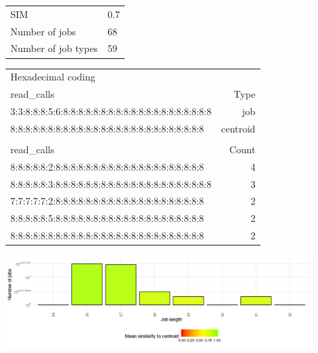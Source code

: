 \documentclass[]{llncs}
\begin{document}
\begingroup
  \centering
  \begin{tabular}{ll}
    SIM                 & 0.7 \\
    Number of jobs      & 68  \\
    Number of job types & 59  \\
  \end{tabular}
  \label{tab:use_case:pm_quant:stats}
\endgroup

\begingroup
  \centering
  \begin{tiny}
    \begin{tabular}{@{ }l@{ }|@{ }r@{ }}
      \rowcolor{tabhcolor}
      Hexadecimal coding & \\
      \rowcolor{tabhcolor}
      read\_calls                                           & Type     \\
      \hline
      3:3:8:8:8:5:6:8:8:8:8:8:8:8:8:8:8:8:8:8:8:8:8:8:8:8:8 & job      \\
      8:8:8:8:8:8:8:8:8:8:8:8:8:8:8:8:8:8:8:8:8:8:8:8:8:8   & centroid \\
      \multicolumn{2}{l}{}\\
      \rowcolor{tabhcolor}
      read\_calls                                           & Count    \\
      \hline
      8:8:8:8:8:2:8:8:8:8:8:8:8:8:8:8:8:8:8:8:8:8:8:8:8:8   & 4        \\
      8:8:8:8:8:3:8:8:8:8:8:8:8:8:8:8:8:8:8:8:8:8:8:8:8:8:8 & 3        \\
      7:7:7:7:7:2:8:8:8:8:8:8:8:8:8:8:8:8:8:8:8:8:8:8:8:8   & 2        \\
      8:8:8:8:8:5:8:8:8:8:8:8:8:8:8:8:8:8:8:8:8:8:8:8:8:8   & 2        \\
      8:8:8:8:8:8:8:8:8:8:8:8:8:8:8:8:8:8:8:8:8:8:8:8:8:8   & 2        \\
    \end{tabular}
  \end{tiny}
  \label{tab:use_case:pm_quant:top_jobs}
\endgroup

\begingroup
  \centering
  \includegraphics[width=4.61in,height=1.39in]{./media/image7.png}
  \label{fig:use_case:pm_quant:length}
\endgroup
\end{document}
